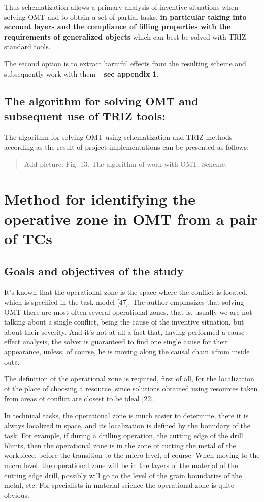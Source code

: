 \documentclass[11pt,a4paper]{book}
\newcommand{\addpicture}[1]{
  \begin{quote} Add picture: #1\end{quote}
}
\begin{document}
Thus schematization allows a primary analysis of inventive situations when
solving OMT and to obtain a set of partial tasks, \textbf{in particular taking
  into account layers and the compliance of filling properties with the
  requirements of generalized objects} which can best be solved with TRIZ
standard tools.

The second option is to extract harmful effects from the resulting scheme and
subsequently work with them -- \textbf{see appendix 1}.

\section[The algorithm]{The algorithm for solving OMT and subsequent use of
  TRIZ tools:}

The algorithm for solving OMT using schematization and TRIZ methods according
as the result of project implementations can be presented as follows:

\addpicture{Fig. 13. The algorithm of work with OMT. Scheme.}

\chapter[Identifying the operative zone]{Method for identifying the operative
  zone in OMT from a pair of TCs}

\section{Goals and objectives of the study}

It’s known that the operational zone is the space where the conflict is
located, which is specified in the task model [47]. The author emphasizes that
solving OMT there are most often several operational zones, that is, usually
we are not talking about a single conflict, being the cause of the inventive
situation, but about their severity. And it’s not at all a fact that, having
performed a cause-effect analysis, the solver is guaranteed to find one single
cause for their appearance, unless, of course, he is moving along the causal
chain «from inside out».

The definition of the operational zone is required, first of all, for the
localization of the place of choosing a resource, since solutions obtained
using resources taken from areas of conflict are closest to be ideal [22].

In technical tasks, the operational zone is much easier to determine, there it
is always localized in space, and its localization is defined by the boundary
of the task. For example, if during a drilling operation, the cutting edge of
the drill blunts, then the operational zone is in the zone of cutting the
metal of the workpiece, before the transition to the micro level, of course.
When moving to the micro level, the operational zone will be in the layers of
the material of the cutting edge drill, possibly will go to the level of the
grain boundaries of the metal, etc. For specialists in material science
the operational zone is quite obvious.
\end{document}
